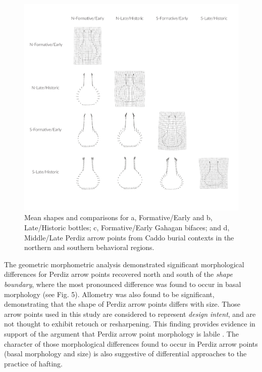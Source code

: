 \documentclass[smallextended]{svjour3}       %
\begin{document}
\begin{figure}
\includegraphics[width=1\linewidth]{ms-figs/figure6} \caption{Mean shapes and comparisons for a, Formative/Early and b, Late/Historic bottles; c, Formative/Early Gahagan bifaces; and d, Middle/Late Perdiz arrow points from Caddo burial contexts in the northern and southern behavioral regions.}\label{fig:fig5}
\end{figure}

The geometric morphometric analysis demonstrated significant
morphological differences for Perdiz arrow points recovered north and
south of the \emph{shape boundary}, where the most pronounced difference
was found to occur in basal morphology (see Fig. 5). Allometry was also
found to be significant, demonstrating that the shape of Perdiz arrow
points differs with size. Those arrow points used in this study are
considered to represent \emph{design intent}, and are not thought to
exhibit retouch or resharpening. This finding provides evidence in
support of the argument that Perdiz arrow point morphology is labile
\cite{RN9364}. The character of those morphological differences found to
occur in Perdiz arrow points (basal morphology and size) is also
suggestive of differential approaches to the practice of hafting.
\end{document}
